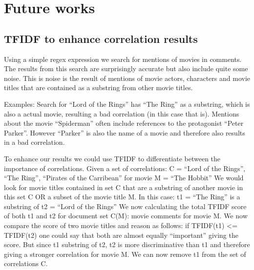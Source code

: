 \section{Future works}
\subsection{TFIDF to enhance correlation results}
Using a simple regex expression we search for mentions of movies in comments. 
The results from this search are surprisingly accurate but also include quite some noise. 
This is noise is the result of mentions of movie actors, characters and movie titles that are contained as a substring from other movie titles. 

Examples:
Search for “Lord of the Rings” has “The Ring” as a substring, which is also a actual movie, resulting a bad correlation (in this case that is). 
Mentions about the movie “Spiderman” often include references to the protagonist “Peter Parker”. However “Parker” is also the name of a movie and therefore also results in a bad correlation.

To enhance our results we could use TFIDF to differentiate between the importance of correlations. 
Given a set of correlations: C = {“Lord of the Rings”, “The Ring”, “Pirates of the Carribean”} for movie M = “The Hobbit”
We would look for movie titles contained in set C that are a substring of another movie in this set C OR a subset of the movie title M. 
In this case: t1 = “The Ring” is a substring of t2 = “Lord of the Rings”
We now calculating the total TFIDF score of both t1 and t2 for document set C(M): movie comments for movie M.
We now compare the score of two movie titles and reason as follows:
if TFIDF(t1) <= TFIDF(t2) one could say that both are almost equally “important” giving the score.
But since t1 substring of t2, t2 is more discriminative than t1 and therefore giving a stronger correlation for movie M. 
We can now remove t1 from the set of correlations C.







